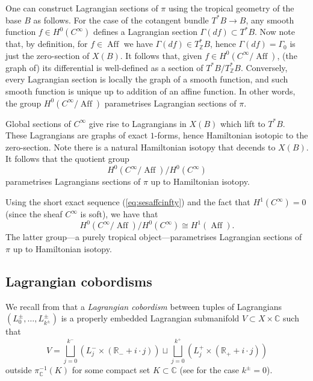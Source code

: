 \documentclass[10pt]{amsart}
\theoremstyle{definition}
\theoremstyle{remark}
\def\C{\mathbb{C}}
\def\R{\mathbb{R}}
\def\Z{\mathbb{Z}}
\DeclareMathOperator{\Aff}{Aff}
\def\inv{^{-1}}
\def\x{\times}
\begin{document}
One can construct Lagrangian sections of $\pi$ using the tropical geometry of the base $B$ as follows.
For the case of the cotangent bundle $T^*B \to B$, any smooth function $f \in H^0(C^\infty)$ defines a Lagrangian section $\Gamma(df) \subset T^*B$.
Now note that, by definition, for $f \in \Aff$ we have $\Gamma(df) \in T^*_\Z B$, hence $\Gamma(df) = \Gamma_0$ is just the zero-section of $X(B)$.
It follows that, given $f \in H^0(C^\infty/\Aff)$, (the graph of) its differential is well-defined as a section of $T^*B/T^*_\Z B$.
Conversely, every Lagrangian section is locally the graph of a smooth function, and such smooth function is unique up to addition of an affine function.
In other words, the group $H^0(C^\infty/\Aff)$ parametrises Lagrangian sections of $\pi$.

Global sections of $C^\infty$ give rise to Lagrangians in $X(B)$ which lift to $T^*B$.
These Lagrangians are graphs of exact $1$-forms, hence Hamiltonian isotopic to the zero-section. 
Note there is a natural Hamiltonian isotopy that decends to $X(B)$.
It follows that the quotient group
$$
H^0(C^\infty/\Aff) / H^0(C^\infty)
$$
parametrises Lagrangians sections of $\pi$ up to Hamiltonian isotopy.

Using the short exact sequence (\ref{eq:sesaffcinfty}) and the fact that $H^1(C^\infty)=0$ (since the sheaf $C^\infty$ is soft), we have that
\begin{equation}\label{eq:H1Affasquotient}
    H^0(C^\infty/\Aff) / H^0(C^\infty) \cong H^1(\Aff).
\end{equation}
The latter group---a purely tropical object---parametrises Lagrangian sections of $\pi$ up to Hamiltonian isotopy. \subsection{Lagrangian cobordisms}\label{sec:lagcobgroup}
We recall from  that a \emph{Lagrangian cobordism} between tuples of Lagrangians $(L_0^\pm,\dots,L_{k^\pm}^\pm)$ is a properly embedded Lagrangian submanifold $V \subset X \x \C$ such that
$$
V = \bigsqcup_{j=0}^{k^-} \left(L^-_j \x (\R_- + i \cdot j)\right) \sqcup \bigsqcup_{j=0}^{k^+} \left(L^+_j \x (\R_+ + i \cdot j)\right)
$$
outside $\pi\inv_\C(K)$ for some compact set $K \subset \C$ (see  for the case $k^\pm =0$).
\end{document}
